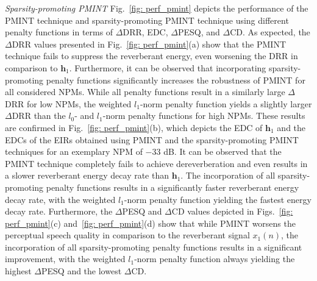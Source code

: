\documentclass[10pt]{IEEEtran}
\begin{document}
\vskip 5pt
{\textit{Sparsity-promoting PMINT}}
\vskip 5pt
Fig.~\ref{fig: perf_pmint} depicts the performance of the PMINT technique and sparsity-promoting PMINT technique using different penalty functions in terms of $\Delta$DRR, EDC, $\Delta$PESQ, and $\Delta$CD. 
As expected, the $\Delta$DRR values presented in Fig.~\ref{fig: perf_pmint}(a) show that the PMINT technique fails to suppress the reverberant energy, even worsening the DRR in comparison to $\mathbf{h}_1$. 
Furthermore, it can be observed that incorporating sparsity-promoting penalty functions significantly increases the robustness of PMINT for all considered NPMs.
While all penalty functions result in a similarly large $\Delta$DRR for low NPMs, the weighted $l_1$-norm penalty function yields a slightly larger $\Delta$DRR than the $l_0$- and $l_1$-norm penalty functions for high NPMs.
These results are confirmed in Fig.~\ref{fig: perf_pmint}(b), which depicts the EDC of $\mathbf{h}_1$ and the EDCs of the EIRs obtained using PMINT and the sparsity-promoting PMINT techniques for an exemplary NPM of $-33$ dB.
It can be observed that the PMINT technique completely fails to achieve dereverberation and even results in a slower reverberant energy decay rate than $\mathbf{h}_1$.
The incorporation of all sparsity-promoting penalty functions results in a significantly faster reverberant energy decay rate, with the weighted $l_1$-norm penalty function yielding the fastest energy decay rate.
Furthermore, the $\Delta$PESQ and $\Delta$CD values depicted in Figs.~\ref{fig: perf_pmint}(c) and~\ref{fig: perf_pmint}(d) show that while PMINT worsens the perceptual speech quality in comparison to the reverberant signal $x_1(n)$, the incorporation of all sparsity-promoting penalty functions results in a significant improvement, with the weighted $l_1$-norm penalty function always yielding the highest $\Delta$PESQ and the lowest $\Delta$CD.

\vskip 2pt
\end{document}
